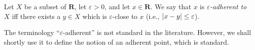 \begin{definition}\label{9.1.5}
    Let \(X\) be a subset of \(\mathbf{R}\), let \(\varepsilon > 0\), and let \(x \in \mathbf{R}\).
    We say that \(x\) is \emph{\(\varepsilon\)-adherent to \(X\)} iff there exists a \(y \in X\) which is \(\varepsilon\)-close to \(x\)
    (i.e., \(\abs*{x - y} \leq \varepsilon\)).
\end{definition}

\begin{remark}\label{9.1.6}
    The terminology ``\(\varepsilon\)-adherent'' is not standard in the literature.
    However, we shall shortly use it to define the notion of an adherent point, which is standard.
\end{remark}